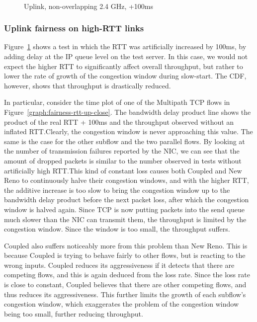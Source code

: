 \begin{figure}[h]
 \centering
 \subfloat[][CDF] {\
   \label{graph:fairness-rtt-up-cdf}
 }
 \\
 \subfloat[][Multipath TCP time plot] {\
   \label{graph:fairness-rtt-up-close}
 }
 \caption{Uplink, non-overlapping 2.4 GHz, +100ms}\label{graph:fairness-rtt-up}
\end{figure}

\subsubsection{Uplink fairness on high-RTT links}

Figure~\ref{graph:fairness-rtt-up} shows a test in which the RTT was
artificially increased by 100ms, by adding delay at the IP queue level on the
test server. In this case, we would not expect the higher RTT to significantly
affect overall throughput, but rather to lower the rate of growth of the
congestion window during slow-start. The CDF, however, shows that throughput is
drastically reduced.

In particular, consider the time plot of one of the Multipath
TCP flows in Figure~\ref{graph:fairness-rtt-up-close}. The bandwidth delay product line shows
the product of the real RTT + 100ms and the throughput observed without an
inflated RTT.\@ Clearly, the congestion window is never approaching this value.
The same is the case for the other subflow and the two parallel flows. By
looking at the number of transmission failures reported by the NIC, we can see
that the amount of dropped packets is similar to the number observed in tests
without artificially high RTT.\@ This kind of constant loss causes both Coupled
and New Reno to continuously halve their congestion windows, and with the higher
RTT, the additive increase is too slow to bring the congestion window up to the
bandwidth delay product before the next packet loss, after which the congestion 
window is halved again. Since TCP is now putting packets into the send queue 
much slower than the NIC can transmit them, the throughput is limited by the 
congestion window. Since the window is too small, the throughput suffers.

Coupled also suffers noticeably more from this problem than New Reno. This is
because Coupled is trying to behave fairly to other flows, but is reacting to
the wrong inputs.  Coupled reduces its aggressiveness if it detects that there
are competing flows, and this is again deduced from the loss rate. Since the
loss rate is close to constant, Coupled believes that there are other competing
flows, and thus reduces its aggressiveness. This further limits the growth of
each subflow's congestion window, which exaggerates the problem of the
congestion window being too small, further reducing throughput.


